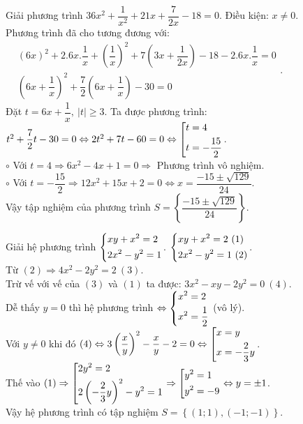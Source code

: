 \begin{ex}%
	Giải phương trình $36x^2+\dfrac{1}{x^2}+21x+\dfrac{7}{2x}-18=0$.
\loigiai
    {Điều kiện: $x\ne 0$.\\
    Phương trình đã cho tương đương với:\\
    $\begin{aligned}
    &(6x)^2+2.6x.\dfrac{1}{x}+\left(\dfrac{1}{x}\right)^2+7\left(3x+\dfrac{1}{2x}\right)-18-2.6x.\dfrac{1}{x}=0\\&
    \left(6x+\dfrac{1}{x}\right)^2+\dfrac{7}{2}\left(6x+\dfrac{1}{x}\right)-30=0
    \end{aligned}
    $.\\
    Đặt $t=6x+\dfrac{1}{x},\ \left|t\right|\ge 3$. Ta được phương trình:\\
    $t^2+\dfrac{7}{2}t-30=0\Leftrightarrow 2t^2+7t-60=0\Leftrightarrow \left[\begin{aligned}&t=4\\&t=-\dfrac{15}{2}\end{aligned}\right.$.\\
    $\circ$ Với $t=4\Rightarrow 6x^2-4x+1=0\Rightarrow $ Phương trình vô nghiệm.\\
    $\circ$ Với $t=-\dfrac{15}{2}\Rightarrow 12x^2+15x+2=0\Leftrightarrow x=\dfrac{-15\pm \sqrt{129}}{24}$.\\
    Vậy tập nghiệm của phương trình $S=\left\{\dfrac{-15\pm \sqrt{129}}{24}\right\}$.
    }
\end{ex}
\begin{ex}%
	Giải hệ phương trình $\left\{\begin{aligned}&xy+x^2=2\\&2x^2-y^2=1\end{aligned}\right.$.
\loigiai
    {
    $\heva{&xy+x^2=2\ (1)\\&2x^2-y^2=1\ (2)}$.\\
    Từ $(2)\Rightarrow 4x^2-2y^2=2\ (3)$.\\
    Trừ vế với vế của $(3)$ và $(1)$ ta được: $3x^2-xy-2y^2=0\ (4)$.\\
    Dễ thấy $y=0$ thì hệ phương trình $\Leftrightarrow \left\{\begin{aligned}&x^2=2\\&x^2=\dfrac{1}{2}\end{aligned}\right.$ (vô lý).\\
    Với $y\ne 0$ khi đó $(4)\Leftrightarrow 3\left(\dfrac{x}{y}\right)^2-\dfrac{x}{y}-2=0\Leftrightarrow \left[\begin{aligned}&x=y\\&x=-\dfrac{2}{3}y\end{aligned}\right.$.\\ Thế vào $(1)\Rightarrow \left[\begin{aligned}&2y^2=2\\&2\left(-\dfrac{2}{3}y\right)^2-y^2=1\end{aligned}\right.\Rightarrow \left[\begin{aligned}&y^2=1\\&y^2=-9\end{aligned}\right.\Leftrightarrow y=\pm 1$.\\
    Vậy hệ phương trình có tập nghiệm $S=\left\{(1;1),(-1;-1)\right\}$.
    }
\end{ex}
